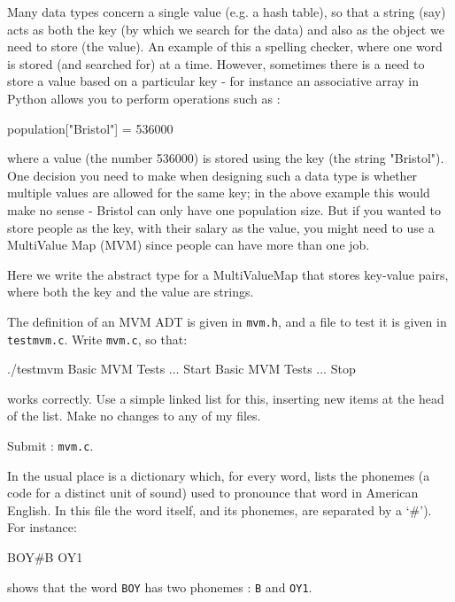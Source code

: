 






Many data types concern a single value (e.g. a hash table), so that
a string (say) acts as both the key (by which we search for the data)
and also as the object we need to store (the value). An example of this a spelling checker,
where one word is stored (and searched for) at a time.  However, sometimes
there is a need to store a value based on a particular key - for instance
an associative array in Python allows you to perform operations such as :
\begin{codesnippet} 
population["Bristol"] = 536000
\end{codesnippet} 
where a value (the number 536000) is stored using the key (the string "Bristol").
One decision you need to make when designing such a data type is whether
multiple values are allowed for the same key; in the above example this
would make no sense - Bristol can only have one population size. But if
you wanted to store people as the key, with their salary as the value,
you might need to use a MultiValue Map (MVM) since people can have more than
one job.

Here we write the abstract type for a MultiValueMap that stores key-value pairs,
where both the key and the value are strings.

\begin{exercise}
\label{ex:mvm}
The definition of an MVM ADT is given in \verb^mvm.h^, and a file to test it is given
in \verb^testmvm.c^.  Write \verb^mvm.c^, so that:
{\small
\begin{terminaloutput}
./testmvm
Basic MVM Tests ... Start
Basic MVM Tests ... Stop
\end{terminaloutput}
}
\noindent works correctly. Use a simple linked list for this, inserting
new items at the head of the list.
Make no changes to any of my files.

Submit : \verb^mvm.c^.
\end{exercise}


In the usual place is a dictionary which, for every word, lists the
phonemes (a code for a distinct unit of sound) used to pronounce that word
in American English. In this file the word itself, and its phonemes,
are separated by a `\#').  For instance:
\begin{codesnippet}
BOY#B OY1
\end{codesnippet}
shows that the word \verb^BOY^ has two phonemes : \verb^B^ and \verb^OY1^.


